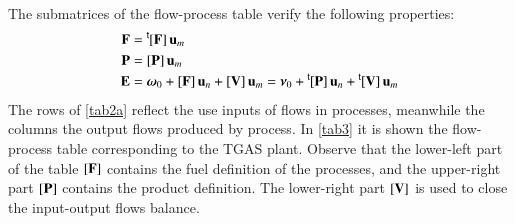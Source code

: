 \documentclass{ecos2018}
\begin{document}
The submatrices of the flow-process table verify the following properties:
\begin{align}
\mathbf{F}&=\prescript{\smash{\mathsf{t}}}{}{\mskip-1mu}[\mathbf{F}]\,\mathbf{u}_m \\
\mathbf{P}&=[\mathbf{P}]\,\mathbf{u}_m \\
\mathbf{E}&=\bm{\omega}_0 + [\mathbf{F}]\,\mathbf{u}_n + [\mathbf{V}]\,\mathbf{u}_m = \bm{\nu}_0 + \prescript{\smash{\mathsf{t}}}{}{\mskip-1mu}[\mathbf{P}]\,\mathbf{u}_n + \prescript{\smash{\mathsf{t}}}{}{\mskip-1mu}[\mathbf{V}]\,\mathbf{u}_m
\end{align}
The rows of \cref{tab2a} reflect the use inputs of flows in processes, meanwhile the columns the output flows produced by process. In \cref{tab3} it is shown the flow-process table corresponding to the TGAS plant. Observe that the lower-left part of the table $\left[ \textbf{F} \right]$ contains the fuel definition of the processes, and the upper-right part $\left[ \textbf{P} \right]$ contains the product definition. The lower-right part $\left[ \textbf{V} \right]$ is used to close the input-output flows balance.
\end{document}
